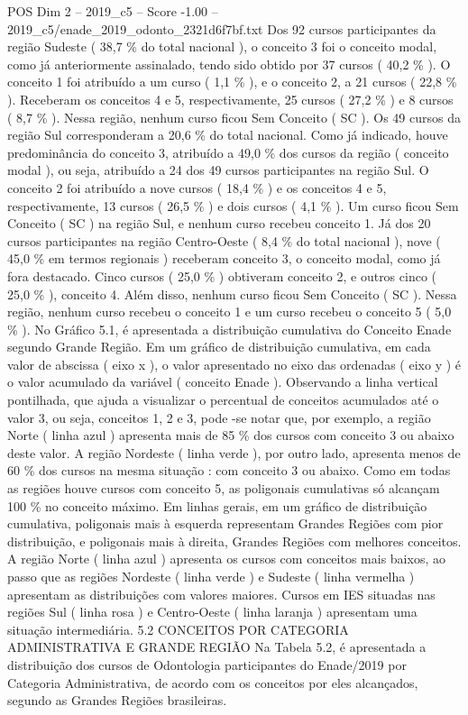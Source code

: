 \begin{textsample}{POS Dim 2 – 2019\_c5 – Score -1.00 – 2019\_c5/enade\_2019\_odonto\_2321d6f7bf.txt}
Dos 92 cursos participantes da região Sudeste ( 38,7 \% do total nacional ), o conceito 3 foi o conceito modal, como já anteriormente assinalado, tendo sido obtido por 37 cursos ( 40,2 \% ).
O conceito 1 foi atribuído a um curso ( 1,1 \% ), e o conceito 2, a 21 cursos ( 22,8 \% ).
Receberam os conceitos 4 e 5, respectivamente, 25 cursos ( 27,2 \% ) e 8 cursos ( 8,7 \% ).
Nessa região, nenhum curso ficou Sem Conceito ( SC ).
Os 49 cursos da região Sul corresponderam a 20,6 \% do total nacional.
Como já indicado, houve predominância do conceito 3, atribuído a 49,0 \% dos cursos da região ( conceito modal ), ou seja, atribuído a 24 dos 49 cursos participantes na região Sul.
O conceito 2 foi atribuído a nove cursos ( 18,4 \% ) e os conceitos 4 e 5, respectivamente, 13 cursos ( 26,5 \% ) e dois cursos ( 4,1 \% ).
Um curso ficou Sem Conceito ( SC ) na região Sul, e nenhum curso recebeu conceito 1.
Já dos 20 cursos participantes na região Centro-Oeste ( 8,4 \% do total nacional ), nove ( 45,0 \% em termos regionais ) receberam conceito 3, o conceito modal, como já fora destacado.
Cinco cursos ( 25,0 \% ) obtiveram conceito 2, e outros cinco ( 25,0 \% ), conceito 4.
Além disso, nenhum curso ficou Sem Conceito ( SC ).
Nessa região, nenhum curso recebeu o conceito 1 e um curso recebeu o conceito 5 ( 5,0 \% ).
No Gráfico 5.1, é apresentada a distribuição cumulativa do Conceito Enade segundo Grande Região.
Em um gráfico de distribuição cumulativa, em cada valor de abscissa ( eixo x ), o valor apresentado no eixo das ordenadas ( eixo y ) é o valor acumulado da variável ( conceito Enade ).
Observando a linha vertical pontilhada, que ajuda a visualizar o percentual de conceitos acumulados até o valor 3, ou seja, conceitos 1, 2 e 3, pode -se notar que, por exemplo, a região Norte ( linha azul ) apresenta mais de 85 \% dos cursos com conceito 3 ou abaixo deste valor.
A região Nordeste ( linha verde ), por outro lado, apresenta menos de 60 \% dos cursos na mesma situação : com conceito 3 ou abaixo.
Como em todas as regiões houve cursos com conceito 5, as poligonais cumulativas só alcançam 100 \% no conceito máximo.
Em linhas gerais, em um gráfico de distribuição cumulativa, poligonais mais à esquerda representam Grandes Regiões com pior distribuição, e poligonais mais à direita, Grandes Regiões com melhores conceitos.
A região Norte ( linha azul ) apresenta os cursos com conceitos mais baixos, ao passo que as regiões Nordeste ( linha verde ) e Sudeste ( linha vermelha ) apresentam as distribuições com valores maiores.
Cursos em IES situadas nas regiões Sul ( linha rosa ) e Centro-Oeste ( linha laranja ) apresentam uma situação intermediária. 5.2 CONCEITOS POR CATEGORIA ADMINISTRATIVA E GRANDE REGIÃO Na Tabela 5.2, é apresentada a distribuição dos cursos de Odontologia participantes do Enade/2019 por Categoria Administrativa, de acordo com os conceitos por eles alcançados, segundo as Grandes Regiões brasileiras.

\end{textsample}
